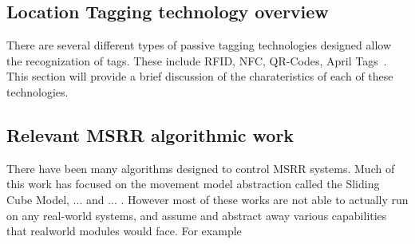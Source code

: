 \subsection{Location Tagging technology overview}
\label{sec:RWtaggingTech}

There are several different types of passive tagging technologies designed allow the recognization of tags. These include RFID, NFC, QR-Codes, April Tags~\cite{wang2016iros}. This section will provide a brief discussion of the charateristics of each of these technologies.


\subsection{Relevant MSRR algorithmic work}
\label{sec:RW-Algorithmic}
There have been many algorithms designed to control MSRR systems. Much of this work has focused on the movement model abstraction called the Sliding Cube Model, ... and ... . However most of these works are not able to actually run on any real-world systems, and assume and abstract away various capabilities that realworld modules would face. For example 